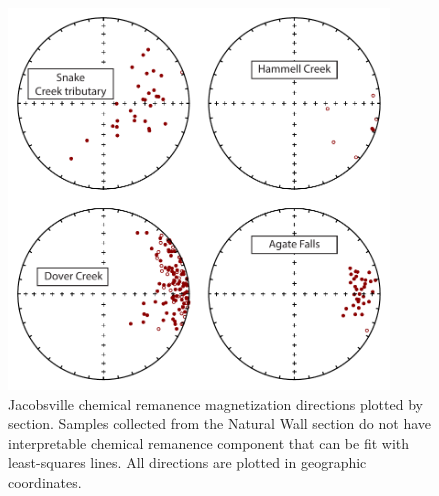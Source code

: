 \begin{figure}
\centering
\includegraphics[width=0.9\textwidth]{figure/Zhang2024a/SI_hct.pdf}
\caption[Jacobsville Formation chemical remanent magnetization]{Jacobsville chemical remanence magnetization directions plotted by section. Samples collected from the Natural Wall section do not have interpretable chemical remanence component that can be fit with least-squares lines. All directions are plotted in geographic coordinates.}
\label{fig:Jacobsville_CRM}
\end{figure}

